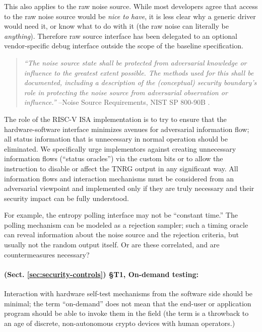    This also applies to the raw noise source. While most developers agree
    that access to the raw noise source would be \emph{nice to have},
    it is less clear why a generic driver would need it, or know what to
    do with it (the raw noise can literally be \emph{anything}).
    Therefore raw source interface has been delegated to an optional
    vendor-specific debug interface outside the scope of the baseline
    specification.

    \begin{quote}
    {\it ``The noise source state shall be protected from adversarial
        knowledge or influence to the greatest extent possible. The methods
        used for this shall be documented, including a description of the
        (conceptual) security boundary’s role in protecting the noise source
        from adversarial observation or influence.''}
    \flushright --Noise Source Requirements, NIST SP 800-90B \cite{TuBaKe+18}.
    \end{quote}

    The role of the RISC-V ISA implementation is to try to ensure that the
    hardware-software interface minimizes avenues for adversarial information
    flow; all status information that is unnecessary in normal operation
    should be eliminated. We specifically urge implementors against creating
    unnecessary information flows (``status oracles'') via the custom bits
    or to allow the instruction to disable or affect the TNRG output in any
    significant way. All information flows and interaction mechanisms must
    be considered from an adversarial viewpoint and implemented only if they
    are truly necessary and their security impact can be fully understood.

    For example, the entropy polling interface may not be ``constant time.''
    The polling mechanism can be modeled as a rejection sampler; such a
    timing oracle can reveal information about the noise source and the
    rejection criteria, but usually not the random output itself.
    Or are these correlated, and are countermeasures necessary?

    \paragraph{(Sect. \ref{sec:security-controls}) \S T1, On-demand testing:}
    Interaction with hardware self-test mechanisms
    from the software side should be minimal; the term ``on-demand'' does not
    mean that the end-user or application program should be able to invoke
    them in the field (the term is a throwback to an age of discrete,
    non-autonomous crypto devices with human operators.)

